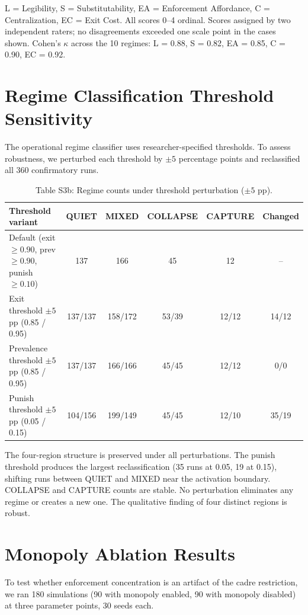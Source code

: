 \documentclass[12pt]{article}
\begin{document}
\noindent L = Legibility, S = Substitutability, EA = Enforcement Affordance, C = Centralization, EC = Exit Cost. All scores 0--4 ordinal. Scores assigned by two independent raters; no disagreements exceeded one scale point in the cases shown. Cohen's $\kappa$ across the 10 regimes: L = 0.88, S = 0.82, EA = 0.85, C = 0.90, EC = 0.92.


\section{Regime Classification Threshold Sensitivity}

The operational regime classifier uses researcher-specified thresholds. To assess robustness, we perturbed each threshold by $\pm 5$ percentage points and reclassified all 360 confirmatory runs.

\begin{table}[ht]
\centering
\caption{Table S3b: Regime counts under threshold perturbation ($\pm 5$ pp).}
\begin{tabular}{lccccc}
\toprule
Threshold variant & QUIET & MIXED & COLLAPSE & CAPTURE & Changed \\
\midrule
Default (exit $\geq 0.90$, prev $\geq 0.90$, punish $\geq 0.10$) & 137 & 166 & 45 & 12 & -- \\
Exit threshold $\pm 5$pp (0.85 / 0.95) & 137/137 & 158/172 & 53/39 & 12/12 & 14/12 \\
Prevalence threshold $\pm 5$pp (0.85 / 0.95) & 137/137 & 166/166 & 45/45 & 12/12 & 0/0 \\
Punish threshold $\pm 5$pp (0.05 / 0.15) & 104/156 & 199/149 & 45/45 & 12/10 & 35/19 \\
\bottomrule
\end{tabular}
\end{table}

The four-region structure is preserved under all perturbations. The punish threshold produces the largest reclassification (35 runs at 0.05, 19 at 0.15), shifting runs between QUIET and MIXED near the activation boundary. COLLAPSE and CAPTURE counts are stable. No perturbation eliminates any regime or creates a new one. The qualitative finding of four distinct regions is robust.


\section{Monopoly Ablation Results}

To test whether enforcement concentration is an artifact of the cadre restriction, we ran 180 simulations (90 with monopoly enabled, 90 with monopoly disabled) at three parameter points, 30 seeds each.
\end{document}
